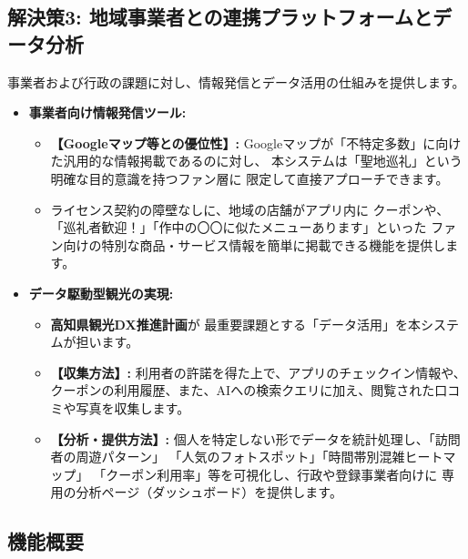 \documentclass{docs}
\begin{document}
\subsection{解決策3: 地域事業者との連携プラットフォームとデータ分析}
事業者および行政の課題に対し、情報発信とデータ活用の仕組みを提供します。
\begin{itemize}
    \item \textbf{事業者向け情報発信ツール:}
    \begin{itemize}
        \item \textbf{【Googleマップ等との優位性】:}
        Googleマップが「不特定多数」に向けた汎用的な情報掲載であるのに対し、
        本システムは「聖地巡礼」という明確な目的意識を持つファン層に
        限定して直接アプローチできます。
        \item ライセンス契約\cite{nri2024}の障壁なしに、地域の店舗がアプリ内に
        クーポンや、「巡礼者歓迎！」「作中の〇〇に似たメニューあります」といった
        ファン向けの特別な商品・サービス情報を簡単に掲載できる機能を提供します。
    \end{itemize}
    \item \textbf{データ駆動型観光の実現:}
    \begin{itemize}
        \item \textbf{高知県観光DX推進計画\cite{kochi_dx_plan}}が
        最重要課題とする「データ活用」を本システムが担います。
        \item \textbf{【収集方法】:}
        利用者の許諾を得た上で、アプリのチェックイン情報や、
        クーポンの利用履歴、また、AIへの検索クエリに加え、閲覧された口コミや写真を収集します。
        \item \textbf{【分析・提供方法】:}
        個人を特定しない形でデータを統計処理し、「訪問者の周遊パターン」
        「人気のフォトスポット」「時間帯別混雑ヒートマップ」
        「クーポン利用率」等を可視化し、行政や登録事業者向けに
        専用の分析ページ（ダッシュボード）を提供します。
    \end{itemize}
\end{itemize}

\subsection{機能概要}
\end{document}
